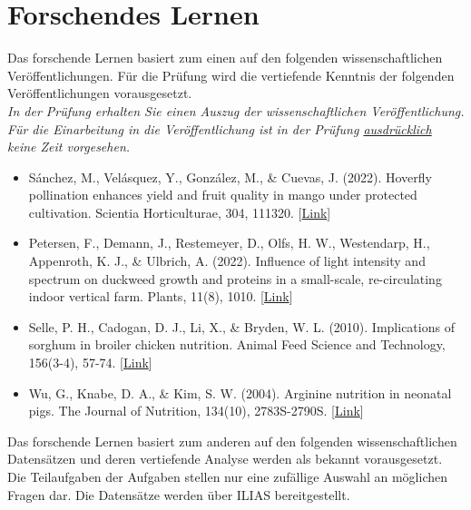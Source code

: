 \documentclass[a4paper, 9pt]{scrartcl}\usepackage[]{graphicx}\usepackage[]{xcolor}
\begin{document}
 
\clearpage
\part{Forschendes Lernen}

Das forschende Lernen basiert zum einen auf den folgenden wissenschaftlichen Veröffentlichungen. Für die Prüfung wird die vertiefende Kenntnis der folgenden Veröffentlichungen vorausgesetzt.\\

\textit{In der Prüfung erhalten Sie einen Auszug der wissenschaftlichen Veröffentlichung. Für die Einarbeitung in die Veröffentlichung ist in der Prüfung \underline{ausdrücklich} keine Zeit vorgesehen.}

\begin{itemize}[noitemsep]
\item Sánchez, M., Velásquez, Y., González, M., \& Cuevas, J. (2022). Hoverfly pollination enhances yield and fruit quality in mango under protected cultivation. Scientia Horticulturae, 304, 111320. [\href{https://www.sciencedirect.com/science/article/pii/S0304423822004411}{Link}]
\item Petersen, F., Demann, J., Restemeyer, D., Olfs, H. W., Westendarp, H., Appenroth, K. J., \& Ulbrich, A. (2022). Influence of light intensity and spectrum on duckweed growth and proteins in a small-scale, re-circulating indoor vertical farm. Plants, 11(8), 1010. [\href{https://www.mdpi.com/2223-7747/11/8/1010}{Link}]
\item Selle, P. H., Cadogan, D. J., Li, X., \& Bryden, W. L. (2010). Implications of sorghum in broiler chicken nutrition. Animal Feed Science and Technology, 156(3-4), 57-74. [\href{https://www.sciencedirect.com/science/article/pii/S0377840110000209}{Link}]
\item Wu, G., Knabe, D. A., \& Kim, S. W. (2004). Arginine nutrition in neonatal pigs. The Journal of Nutrition, 134(10), 2783S-2790S. [\href{https://www.sciencedirect.com/science/article/pii/S0022316623031279}{Link}]
\end{itemize}

Das forschende Lernen basiert zum anderen auf den folgenden wissenschaftlichen Datensätzen und deren vertiefende Analyse werden als bekannt vorausgesetzt. Die Teilaufgaben der Aufgaben stellen nur eine zufällige Auswahl an möglichen Fragen dar. Die Datensätze werden über ILIAS bereitgestellt.\\
\end{document}
